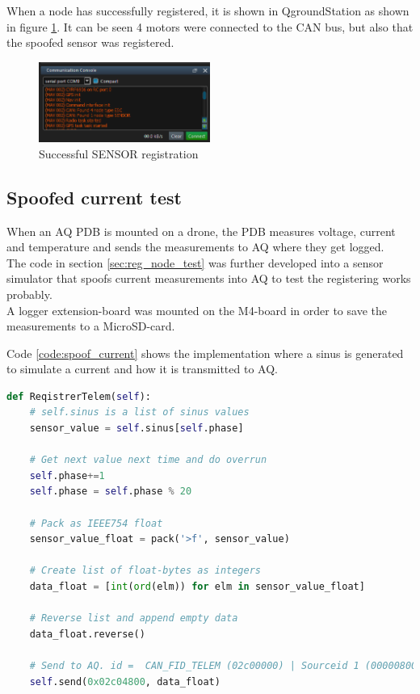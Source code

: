 When a node has successfully registered, it is shown in QgroundStation as shown in figure \ref{fig:successful_register}.
It can be seen 4 motors were connected to the CAN bus, but also that the spoofed sensor was registered.

\begin{figure}[H]
    \center
    \includegraphics[width=0.5\textwidth]{graphics/test_register_node.png}
    \caption{Successful SENSOR registration}
    \label{fig:successful_register}
\end{figure}

\subsection{Spoofed current test}
When an AQ PDB is mounted on a drone, the PDB measures voltage, current and temperature and sends the measurements to AQ where they get logged.\\
The code in section \ref{sec:reg_node_test} was further developed into a sensor simulator that spoofs current measurements into AQ to test the registering works probably. \\
A logger extension-board was mounted on the M4-board in order to save the measurements to a MicroSD-card.

Code \ref{code:spoof_current} shows the implementation where a sinus is generated to simulate a current and how it is transmitted to AQ.

\begin{lstlisting}[language = python, caption = Snippet spoofing current measurements into AQ, label=code:spoof_current]
def ReqistrerTelem(self):
	# self.sinus is a list of sinus values
	sensor_value = self.sinus[self.phase]

	# Get next value next time and do overrun
	self.phase+=1
	self.phase = self.phase % 20

	# Pack as IEEE754 float
	sensor_value_float = pack('>f', sensor_value)

	# Create list of float-bytes as integers
	data_float = [int(ord(elm)) for elm in sensor_value_float]

	# Reverse list and append empty data
	data_float.reverse()
	
	# Send to AQ. id =  CAN_FID_TELEM (02c00000) | Sourceid 1 (00000800) | CAN_SENSORS_PDB_BATA (00004000)
	self.send(0x02c04800, data_float)
\end{lstlisting}

